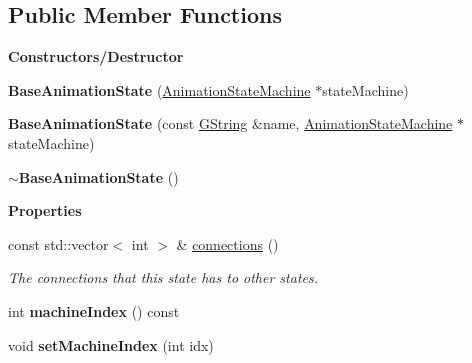 \subsection*{Public Member Functions}
\begin{Indent}\textbf{ Constructors/\+Destructor}\par
\begin{DoxyCompactItemize}
\item 
\mbox{\label{classrev_1_1_base_animation_state_a0762dbb6a4c52464322ae7ccae630bef}} 
{\bfseries Base\+Animation\+State} (\mbox{\hyperlink{classrev_1_1_animation_state_machine}{Animation\+State\+Machine}} $\ast$state\+Machine)
\item 
\mbox{\label{classrev_1_1_base_animation_state_a3921386104db3ba208b9c12de1fcb83f}} 
{\bfseries Base\+Animation\+State} (const \mbox{\hyperlink{classrev_1_1_g_string}{G\+String}} \&name, \mbox{\hyperlink{classrev_1_1_animation_state_machine}{Animation\+State\+Machine}} $\ast$state\+Machine)
\item 
\mbox{\label{classrev_1_1_base_animation_state_ab1eabda38cf55895b2301cdb77ec5b4e}} 
{\bfseries $\sim$\+Base\+Animation\+State} ()
\end{DoxyCompactItemize}
\end{Indent}
\begin{Indent}\textbf{ Properties}\par
\begin{DoxyCompactItemize}
\item 
\mbox{\label{classrev_1_1_base_animation_state_a2fef06992d2d5da979a6ca49903a0131}} 
const std\+::vector$<$ int $>$ \& \mbox{\hyperlink{classrev_1_1_base_animation_state_a2fef06992d2d5da979a6ca49903a0131}{connections}} ()
\begin{DoxyCompactList}\small\item\em The connections that this state has to other states. \end{DoxyCompactList}\item 
\mbox{\label{classrev_1_1_base_animation_state_a43458a596f733ad050fe294ab49695a1}} 
int {\bfseries machine\+Index} () const
\item 
\mbox{\label{classrev_1_1_base_animation_state_ab307fd40af5fba518bccd7f345e7174d}} 
void {\bfseries set\+Machine\+Index} (int idx)
\end{DoxyCompactItemize}
\end{Indent}
